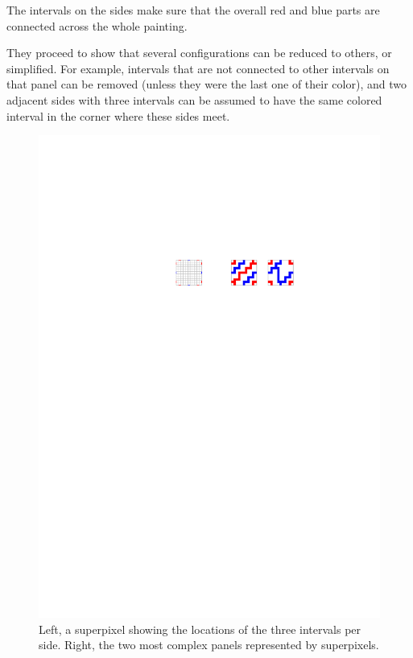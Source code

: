 \documentclass[a4paper, 11pt]{article}
\begin{document}
The intervals on the sides make sure that the overall red and blue parts are connected across the whole painting.

They proceed to show that several configurations can be reduced to others, or simplified. For example, intervals that are not connected to other intervals on that panel can be removed (unless they were the last one of their color), and two adjacent sides with three intervals can be assumed to have the same colored interval in the corner where these sides meet.

\begin{figure}[tb]
\centering
\includegraphics[]{painter-panels.pdf}
\caption{Left, a superpixel showing the locations of the three intervals per side. Right, the two most complex panels represented by superpixels.}
\label{fig:panel}
\end{figure}
\end{document}
